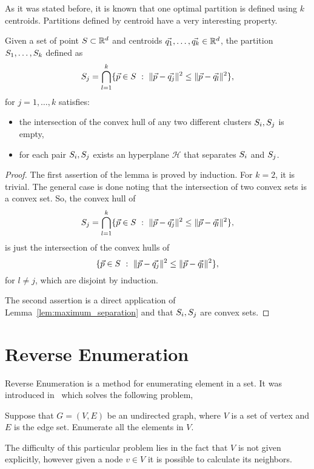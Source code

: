 \documentclass{article}
\newcommand{\cH}{\mathcal{H}}
\begin{document}
As it was stated before, it is known that one optimal partition is defined using
$k$ centroids. Partitions defined by centroid have a very interesting
property.
\begin{lemma}
  Given a set of point $S\subset \mathbb{R}^{d}$ and centroids
  $\vec{q_1},\ldots,\vec{q_k}\in\mathbb{R}^d$, the partition $S_1,\ldots,
  S_k$ defined as 
  \begin{equation*}
    \Set_j=\bigcap_{l=1}^{k}\{\vec{p}\in\Set\ :\ 
    \|\vec{p}-\vec{q_j}\|^2\le \|\vec{p}-\vec{q_l}\|^2\},
  \end{equation*}
  for $j = 1,\ldots, k$ satisfies:
  \begin{itemize}
  \item the intersection of the convex hull of any two different
    clusters $S_i,S_j$ is empty,
  \item for each pair $S_i, S_j$ exists an hyperplane $\cH$ that 
    separates $S_i$ and $S_j$.
  \end{itemize}
\end{lemma}
\begin{proof}
  The first assertion of the lemma is proved by induction. For $k=2$,
  it is trivial. The general case is done noting that the intersection
  of two convex sets is a convex set. So, the convex hull of 
  \begin{equation*}
    \Set_j=\bigcap_{l=1}^{k}\{\vec{p}\in\Set\ :\ 
    \|\vec{p}-\vec{q_j}\|^2\le \|\vec{p}-\vec{q_l}\|^2\},
  \end{equation*}
  is just the intersection of the convex hulls of 
  \begin{equation*}
    \{\vec{p}\in\Set\ :\ 
    \|\vec{p}-\vec{q_j}\|^2\le \|\vec{p}-\vec{q_l}\|^2\},
  \end{equation*}
  for $l\neq j$, which are disjoint by induction.

  The second assertion is a direct application of
  Lemma~\ref{lem:maximum_separation} and that $S_i, S_j$ are
  convex sets. 
\end{proof}

\section{Reverse Enumeration}
\label{sec:reverse_enumeration}
Reverse Enumeration is a method for enumerating element in a set. It
was introduced in~\cite{AvisFukuda} which solves the following
problem,
\begin{problem}
  \label{prob:traversal}
  Suppose that $G = (V, E)$ be an undirected graph, where $V$ is a set
  of vertex and $E$ is the edge set. Enumerate all the elements in $V$. 
\end{problem}
The difficulty of this particular problem lies in the fact that $V$
is  not given explicitly, however given a node $v\in V$ it is possible
to calculate its neighbors.
\end{document}
